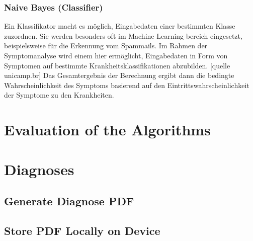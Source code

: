 \subsubsection{Naive Bayes (Classifier)}
Ein Klassifikator macht es möglich, Eingabedaten einer bestimmten Klasse zuzordnen. Sie werden besonders oft im Machine Learning bereich eingesetzt, beispielsweise für die Erkennung vom Spammails. Im Rahmen der Symptomanalyse wird einem hier ermöglicht, Eingabedaten in Form von Symptomen auf bestimmte Krankheitsklassifikationen abzubilden. [quelle unicamp.br] Das Gesamtergebnis der Berechnung ergibt dann die bedingte Wahrscheinlichkeit des Symptoms basierend auf den Eintrittswahrscheinlichkeit der Symptome zu den Krankheiten. 
\section{Evaluation of the Algorithms}
\section{Diagnoses}
\subsection{Generate Diagnose PDF}
\subsection{Store PDF Locally on Device}
